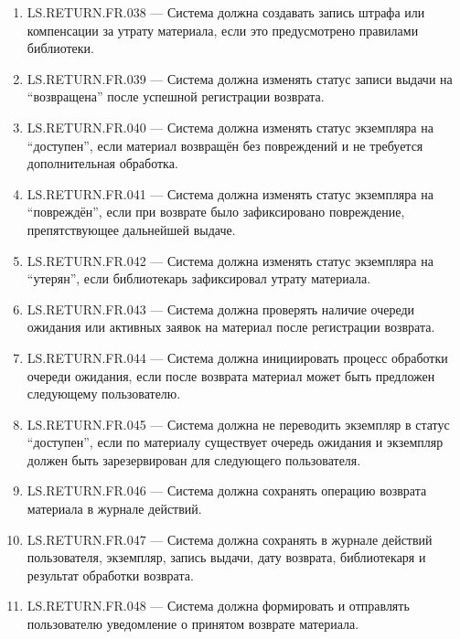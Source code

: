 \documentclass[12pt,a4paper]{article}
\begin{document}
\begin{enumerate}
		\item LS.RETURN.FR.038 --- Система должна создавать запись штрафа или компенсации
		за утрату материала, если это предусмотрено правилами библиотеки.
		
		\item LS.RETURN.FR.039 --- Система должна изменять статус записи выдачи на
		``возвращена'' после успешной регистрации возврата.
		
		\item LS.RETURN.FR.040 --- Система должна изменять статус экземпляра на ``доступен'',
		если материал возвращён без повреждений и не требуется дополнительная обработка.
		
		\item LS.RETURN.FR.041 --- Система должна изменять статус экземпляра на
		``повреждён'', если при возврате было зафиксировано повреждение, препятствующее
		дальнейшей выдаче.
		
		\item LS.RETURN.FR.042 --- Система должна изменять статус экземпляра на
		``утерян'', если библиотекарь зафиксировал утрату материала.
		
		\item LS.RETURN.FR.043 --- Система должна проверять наличие очереди ожидания
		или активных заявок на материал после регистрации возврата.
		
		\item LS.RETURN.FR.044 --- Система должна инициировать процесс обработки очереди
		ожидания, если после возврата материал может быть предложен следующему
		пользователю.
		
		\item LS.RETURN.FR.045 --- Система должна не переводить экземпляр в статус
		``доступен'', если по материалу существует очередь ожидания и экземпляр должен
		быть зарезервирован для следующего пользователя.
		
		\item LS.RETURN.FR.046 --- Система должна сохранять операцию возврата материала
		в журнале действий.
		
		\item LS.RETURN.FR.047 --- Система должна сохранять в журнале действий пользователя,
		экземпляр, запись выдачи, дату возврата, библиотекаря и результат обработки
		возврата.
		
		\item LS.RETURN.FR.048 --- Система должна формировать и отправлять пользователю
		уведомление о принятом возврате материала.
		

\end{enumerate}
\end{document}
